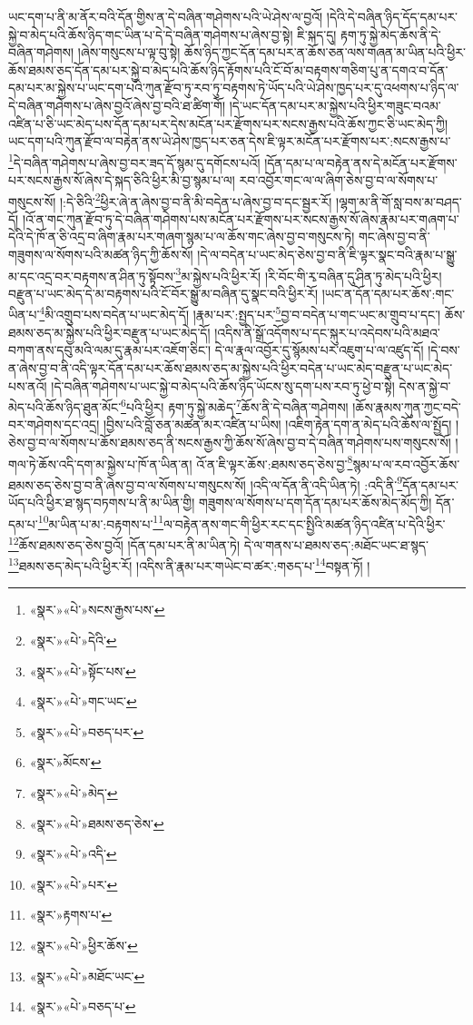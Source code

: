 ཡང་དག་པ་ནི་མ་ནོར་བའི་དོན་གྱིས་ན་དེ་བཞིན་གཤེགས་པའི་ཡེ་ཤེས་ལ་བྱའོ། །དེའི་དེ་བཞིན་ཉིད་དོད་དམ་པར་སྐྱེ་བ་མེད་པའི་ཆོས་ཉིད་གང་ཡིན་པ་དེ་དེ་བཞིན་གཤེགས་པ་ཞེས་བྱ་སྟེ། ཇི་སྐད་དུ། རྟག་ཏུ་སྐྱེ་མེད་ཆོས་ནི་དེ་བཞིན་གཤེགས། །ཞེས་གསུངས་པ་ལྟ་བུ་སྟེ། ཆོས་ཉིད་ཀྱང་དོན་དམ་པར་ན་ཆོས་ཅན་ལས་གཞན་མ་ཡིན་པའི་ཕྱིར་ཆོས་ཐམས་ཅད་དོན་དམ་པར་སྐྱེ་བ་མེད་པའི་ཆོས་ཉིད་རྟོགས་པའི་ངོ་བོ་མ་བརྟགས་གཅིག་པུ་ན་དགའ་བ་དོན་དམ་པར་མ་སྐྱེས་པ་ཡང་དག་པའི་ཀུན་རྫོབ་ཏུ་རབ་ཏུ་བརྟགས་ཏེ་ཡོད་པའི་ཡེ་ཤེས་ཁྱད་པར་དུ་འཕགས་པ་ཉིད་ལ་དེ་བཞིན་གཤེགས་པ་ཞེས་བྱའོ་ཞེས་བྱ་བའི་ཐ་ཚིག་གོ། །དེ་ཡང་དོན་དམ་པར་མ་སྐྱེས་པའི་ཕྱིར་གཟུང་བའམ་འཛིན་པ་ཅི་ཡང་མེད་པས་དོན་དམ་པར་དེས་མངོན་པར་རྫོགས་པར་སངས་རྒྱས་པའི་ཆོས་ཀྱང་ཅི་ཡང་མེད་ཀྱི། ཡང་དག་པའི་ཀུན་རྫོབ་ལ་བརྟེན་ནས་ཡེ་ཤེས་ཁྱད་པར་ཅན་དེས་ཇི་ལྟར་མངོན་པར་རྫོགས་པར་:སངས་རྒྱས་པ་\footnote{«སྣར་»«པེ་»སངས་རྒྱས་པས་}དེ་བཞིན་གཤེགས་པ་ཞེས་བྱ་བར་ཟད་དོ་སྙམ་དུ་དགོངས་པའོ། །དོན་དམ་པ་ལ་བརྟེན་ནས་དེ་མངོན་པར་རྫོགས་པར་སངས་རྒྱས་སོ་ཞེས་དེ་སྐད་ཅིའི་ཕྱིར་མི་བྱ་སྙམ་པ་ལ། རབ་འབྱོར་གང་ལ་ལ་ཞིག་ཅེས་བྱ་བ་ལ་སོགས་པ་གསུངས་སོ། །:དེ་ཅིའི་\footnote{«སྣར་»«པེ་»དེའི་}ཕྱིར་ཞེ་ན་ཞེས་བྱ་བ་ནི་མི་བདེན་པ་ཞེས་བྱ་བ་དང་སྦྱར་རོ། །ལྷག་མ་ནི་གོ་སླ་བས་མ་བཤད་དོ། །འོ་ན་གང་ཀུན་རྫོབ་ཏུ་དེ་བཞིན་གཤེགས་པས་མངོན་པར་རྫོགས་པར་སངས་རྒྱས་སོ་ཞེས་རྣམ་པར་གཞག་པ་དེའི་དེ་ཁོ་ན་ཅི་འདྲ་བ་ཞིག་རྣམ་པར་གཞག་སྙམ་པ་ལ་ཆོས་གང་ཞེས་བྱ་བ་གསུངས་ཏེ། གང་ཞེས་བྱ་བ་ནི་གཟུགས་ལ་སོགས་པའི་མཚན་ཉིད་ཀྱི་ཆོས་སོ། །དེ་ལ་བདེན་པ་ཡང་མེད་ཅེས་བྱ་བ་ནི་ཇི་ལྟར་སྣང་བའི་རྣམ་པ་སྒྱུ་མ་དང་འདྲ་བར་བརྟགས་ན་ཤིན་ཏུ་སྟོབས་\footnote{«སྣར་»«པེ་»སྟོང་པས་}མ་སྐྱེས་པའི་ཕྱིར་རོ། །རི་བོང་གི་རྭ་བཞིན་དུ་ཤིན་ཏུ་མེད་པའི་ཕྱིར། བརྫུན་པ་ཡང་མེད་དེ་མ་བརྟགས་པའི་ངོ་བོར་སྒྱུ་མ་བཞིན་དུ་སྣང་བའི་ཕྱིར་རོ། །ཡང་ན་དོན་དམ་པར་ཆོས་:གང་ཡིན་པ་\footnote{«སྣར་»«པེ་»གང་ཡང་}མི་འགྲུབ་པས་བདེན་པ་ཡང་མེད་དོ། །རྣམ་པར་:སྤྱད་པར་\footnote{«སྣར་»«པེ་»བཅད་པར་}བྱ་བ་བདེན་པ་གང་ཡང་མ་གྲུབ་པ་དང་། ཆོས་ཐམས་ཅད་མ་སྐྱེས་པའི་ཕྱིར་བརྫུན་པ་ཡང་མེད་དོ། །འདིས་ནི་སྒྲོ་འདོགས་པ་དང་སྐུར་པ་འདེབས་པའི་མཐའ་བཀག་ནས་དབུ་མའི་ལམ་དུ་རྣམ་པར་འཇོག་ཅིང་། དེ་ལ་རྣལ་འབྱོར་དུ་སྙོམས་པར་འཇུག་པ་ལ་འཛུད་དོ། །དེ་བས་ན་ཞེས་བྱ་བ་ནི་འདི་ལྟར་དོན་དམ་པར་ཆོས་ཐམས་ཅད་མ་སྐྱེས་པའི་ཕྱིར་བདེན་པ་ཡང་མེད་བརྫུན་པ་ཡང་མེད་པས་ནའོ། །དེ་བཞིན་གཤེགས་པ་ཡང་སྐྱེ་བ་མེད་པའི་ཆོས་ཉིད་ཡོངས་སུ་དག་པས་རབ་ཏུ་ཕྱེ་བ་སྟེ། དེས་ན་སྐྱེ་བ་མེད་པའི་ཆོས་ཉིད་ཐུན་མོང་\footnote{«སྣར་»མོངས་}པའི་ཕྱིར། རྟག་ཏུ་སྐྱེ་མཆེད་\footnote{«སྣར་»«པེ་»མེད་}ཆོས་ནི་དེ་བཞིན་གཤེགས། །ཆོས་རྣམས་ཀུན་ཀྱང་བདེ་བར་གཤེགས་དང་འདྲ། །བྱིས་པའི་བློ་ཅན་མཚན་མར་འཛིན་པ་ཡིས། །འཇིག་རྟེན་དག་ན་མེད་པའི་ཆོས་ལ་སྤྱོད། །ཅེས་བྱ་བ་ལ་སོགས་པ་ཆོས་ཐམས་ཅད་ནི་སངས་རྒྱས་ཀྱི་ཆོས་སོ་ཞེས་བྱ་བ་དེ་བཞིན་གཤེགས་པས་གསུངས་སོ། །གལ་ཏེ་ཆོས་འདི་དག་མ་སྐྱེས་པ་ཁོ་ན་ཡིན་ན། འོ་ན་ཇི་ལྟར་ཆོས་:ཐམས་ཅད་ཅེས་བྱ་\footnote{«སྣར་»«པེ་»ཐམས་ཅད་ཅེས་}སྙམ་པ་ལ་རབ་འབྱོར་ཆོས་ཐམས་ཅད་ཅེས་བྱ་བ་ནི་ཞེས་བྱ་བ་ལ་སོགས་པ་གསུངས་སོ། །འདི་ལ་དོན་ནི་འདི་ཡིན་ཏེ། :འདི་ནི་\footnote{«སྣར་»«པེ་»འདི་}དོན་དམ་པར་ཡོད་པའི་ཕྱིར་ཐ་སྙད་བཏགས་པ་ནི་མ་ཡིན་གྱི། གཟུགས་ལ་སོགས་པ་དག་དོན་དམ་པར་ཆོས་མེད་མོད་ཀྱི། དོན་དམ་པ་\footnote{«སྣར་»«པེ་»པར་}མ་ཡིན་པ་མ་:བརྟགས་པ་\footnote{«སྣར་»རྟགས་པ་}ལ་བརྟེན་ནས་གང་གི་ཕྱིར་རང་དང་སྤྱིའི་མཚན་ཉིད་འཛིན་པ་དེའི་ཕྱིར་\footnote{«སྣར་»«པེ་»ཕྱིར་ཆོས་}ཆོས་ཐམས་ཅད་ཅེས་བྱའོ། །དོན་དམ་པར་ནི་མ་ཡིན་ཏེ། དེ་ལ་གནས་པ་ཐམས་ཅད་:མཐོང་ཡང་ཐ་སྙད་\footnote{«སྣར་»«པེ་»མཐོང་ཡང་}ཐམས་ཅད་མེད་པའི་ཕྱིར་རོ། །འདིས་ནི་རྣམ་པར་གཡེང་བ་ཚར་:གཅད་པ་\footnote{«སྣར་»«པེ་»བཅད་པ་}བསྟན་ཏོ། །
